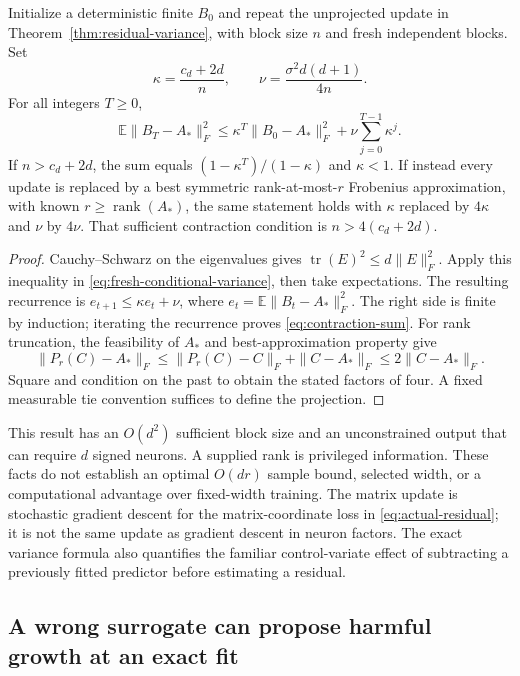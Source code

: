 \begin{corollary}
\label{cor:fresh-contraction}
Initialize a deterministic finite $B_0$ and repeat the unprojected update
in Theorem~\ref{thm:residual-variance}, with block size $n$ and fresh
independent blocks. Set
\[
 \kappa=\frac{c_d+2d}{n},\qquad
 \nu=\frac{\sigma^2d(d+1)}{4n}.
\]
For all integers $T\geq0$,
\begin{equation}
 \mathbb E\|B_T-A_*\|_F^2
 \leq\kappa^T\|B_0-A_*\|_F^2
       +\nu\sum_{j=0}^{T-1}\kappa^j.
 \label{eq:contraction-sum}
\end{equation}
If $n>c_d+2d$, the sum equals
$(1-\kappa^T)/(1-\kappa)$ and $\kappa<1$.
If instead every update is replaced by a best symmetric rank-at-most-$r$
Frobenius approximation, with known $r\geq\operatorname{rank}(A_*)$,
the same statement holds with $\kappa$ replaced by $4\kappa$ and $\nu$
by $4\nu$. That sufficient contraction condition is
$n>4(c_d+2d)$.
\end{corollary}
\begin{proof}
Cauchy--Schwarz on the eigenvalues gives
$\operatorname{tr}(E)^2\leq d\|E\|_F^2$.
Apply this inequality in \eqref{eq:fresh-conditional-variance}, then
take expectations. The resulting recurrence is
$e_{t+1}\leq\kappa e_t+\nu$, where
$e_t=\mathbb E\|B_t-A_*\|_F^2$. The right side is finite by induction;
iterating the recurrence proves \eqref{eq:contraction-sum}.
For rank truncation, the feasibility of $A_*$ and best-approximation
property give
\[
 \|P_r(C)-A_*\|_F
 \leq\|P_r(C)-C\|_F+\|C-A_*\|_F
 \leq2\|C-A_*\|_F.
\]
Square and condition on the past to obtain the stated factors of four.
A fixed measurable tie convention suffices to define the projection.
\end{proof}

This result has an $O(d^2)$ sufficient block size and an unconstrained
output that can require $d$ signed neurons. A supplied rank is privileged
information. These facts do not establish an optimal $O(dr)$ sample
bound, selected width, or a computational advantage over fixed-width
training. The matrix update is stochastic gradient descent for the
matrix-coordinate loss in \eqref{eq:actual-residual}; it is not the same
update as gradient descent in neuron factors. The exact variance formula
also quantifies the familiar control-variate effect of subtracting a
previously fitted predictor before estimating a residual.

\subsection{A wrong surrogate can propose harmful growth at an exact fit}

